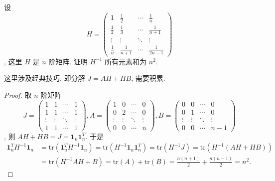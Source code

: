 \documentclass[../../main.tex]{subfiles}%
\begin{document}
\begin{lemma}[Hilbert矩阵逆矩阵元素和]\label{lemma:Hilbert矩阵逆矩阵元素和}
设
\[
H = 
\begin{pmatrix}
1 & \frac{1}{2} & \cdots & \frac{1}{n} \\
\frac{1}{2} & \frac{1}{3} & \cdots & \frac{1}{n + 1} \\
\vdots & \vdots & \ddots & \vdots \\
\frac{1}{n} & \frac{1}{n + 1} & \cdots & \frac{1}{2n - 1}
\end{pmatrix}
\]
, 这里 $H$ 是 $n$ 阶矩阵. 证明 $H^{-1}$ 所有元素和为 $n^{2}$.
\end{lemma}
\begin{note}
这里涉及经典技巧, 即分解 $J = AH + HB$, 需要积累.
\end{note}
\begin{proof}

取 $n$ 阶矩阵
\[
J = 
\begin{pmatrix}
1 & 1 & \cdots & 1 \\
1 & 1 & \cdots & 1 \\
\vdots & \vdots & \ddots & \vdots \\
1 & 1 & \cdots & 1
\end{pmatrix}
,
A = 
\begin{pmatrix}
1 & 0 & \cdots & 0 \\
0 & 2 & \cdots & 0 \\
\vdots & \vdots & \ddots & \vdots \\
0 & 0 & \cdots & n
\end{pmatrix}
,
B = 
\begin{pmatrix}
0 & 0 & \cdots & 0 \\
0 & 1 & \cdots & 0 \\
\vdots & \vdots & \ddots & \vdots \\
0 & 0 & \cdots & n - 1
\end{pmatrix}
\]
,
则 $AH + HB = J = \mathbf{1}_{n}\mathbf{1}_{n}^{T}$. 于是
\begin{align*}
\mathbf{1}_{n}^{T}H^{-1}\mathbf{1}_{n} &= \mathrm{tr}\left(\mathbf{1}_{n}^{T}H^{-1}\mathbf{1}_{n}\right) = \mathrm{tr}\left(H^{-1}\mathbf{1}_{n}\mathbf{1}_{n}^{T}\right) = \mathrm{tr}\left(H^{-1}J\right) = \mathrm{tr}\left(H^{-1}(AH + HB)\right) \\
&= \mathrm{tr}\left(H^{-1}AH + B\right) = \mathrm{tr}(A) + \mathrm{tr}(B) = \frac{n(n + 1)}{2} + \frac{n(n - 1)}{2} = n^{2}.
\end{align*} 

\end{proof}
\end{document}
